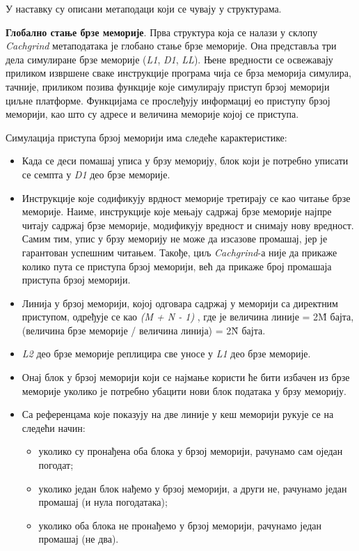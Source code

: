\documentclass[12pt,oneside]{memoir}
\begin{document}
\indent У наставку су описани метаподаци који се чувају у структурама.

\indent \textbf{Глобално стање брзе меморије}. Прва структура која се налази у склопу \textit{Cachgrind} метаподатака је глобано стање брзе меморије. Она представља три дела симулиране брзе меморије (\textit{L1}, \textit{D1},  \textit{LL}). Њене вредности се освежавају приликом извршене сваке инструкције програма чија се брза меморија симулира, тачније, приликом позива функције које симулирају приступ брзој меморији циљне платформе. Функцијама се прослеђују информациј ео приступу брзој меморији, као што су адресе и величина меморије којој се приступа.

\indent Симулација приступа брзој меморији има следеће карактеристике:

\begin{itemize}
  \item Када се деси помашај уписа у брзу меморију, блок који је потребно уписати се семпта у \textit{D1} део брзе меморије. 
  \item Инструкције које содификују врдност меморије третирају се као читање брзе меморије. Наиме, инструкције које мењају садржај брзе меморије најпре читају садржај брзе меморије, модификују вредност и снимају нову вредност. Самим тим, упис у брзу меморију не може да изсазове промашај, јер је гарантован успешним читањем. Такође, циљ \textit{Cachgrind}-а није да прикаже колико пута се приступа брзој меморији, већ да прикаже број промашаја приступа брзој меморији.
   \item Линија у брзој меморији, којој одговара садржај у меморији са директним приступом, одређује се као \textit{ (M + N - 1) }, где је величина линије = 2\^M бајта, (величина брзе меморије / величина линија) = 2\^N бајта.
   \item \textit{L2} део брзе меморије реплицира све уносе у \textit{L1} део брзе меморије.
   \item Онај блок у брзој меморији који се најмање користи ће бити избачен из брзе меморије уколико је потребно убацити нови блок података у брзу меморију.
   \item Са референцама које показују на две линије у кеш меморији рукује се на следећи начин:
   	\begin{itemize}
   		\item уколико су пронађена оба блока у брзој меморији, рачунамо сам оједан погодат;
   		\item уколико један блок нађемо у брзој меморији, а други не, рачунамо један промашај (и нула погодатака);
   		\item уколико оба блока не пронађемо у брзој меморији, рачунамо један промашај (не два).
   	\end{itemize}
\end{itemize}
\end{document}
